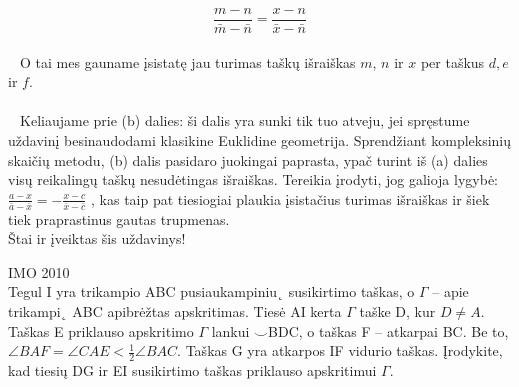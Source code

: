 \begin{sprendimas}
          $$ \frac{m-n}{\bar{m}-\bar{n}}=\frac{x-n}{\bar{x} - \bar{n}}$$
\\$\phantom{a}$ O tai mes gauname įsistatę jau turimas taškų išraiškas $m$, $n$ ir $x$ per taškus $d, e$ ir $f$.
\\
\\$\phantom{a}$ Keliaujame prie (b) dalies: ši dalis yra sunki tik tuo atveju, jei spręstume uždavinį
besinaudodami klasikine Euklidine geometrija. Sprendžiant kompleksinių skaičių metodu, (b) dalis pasidaro
juokingai paprasta, ypač turint iš (a) dalies visų reikalingų taškų nesudėtingas išraiškas. Tereikia įrodyti, jog
galioja lygybė: 
 $\frac{a-x}{\bar{a}-\bar{x}}= - \frac{x-c}{\bar{x} - \bar{c}}$ , kas taip pat tiesiogiai plaukia įsistačius turimas išraiškas ir šiek tiek praprastinus gautas trupmenas.
\\ Štai ir įveiktas šis uždavinys!
\end{sprendimas}

\begin{pavnr}
IMO 2010
\\
Tegul I yra trikampio ABC pusiaukampiniu˛ susikirtimo taškas, o $\Gamma$ – apie trikampi˛
ABC apibrėžtas apskritimas. Tiesė AI kerta $\Gamma$ taške D, kur $D\ne A$. Taškas E priklauso apskritimo
$\Gamma$ lankui $\smile$BDC, o taškas F – atkarpai BC. Be to,
$\angle BAF = \angle CAE < \tfrac{1}{2}\angle BAC$.
Taškas G yra atkarpos IF vidurio taškas. Įrodykite, kad tiesių DG ir EI susikirtimo taškas priklauso
apskritimui $\Gamma$.
\end{pavnr}

